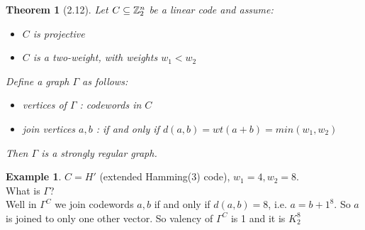 \documentclass[]{article}
\newtheorem{thm}{Theorem}[section]
\theoremstyle{definition}
\newtheorem*{exmp}{Example}
\theoremstyle{remark}
\numberwithin{equation}{section}
\begin{document}
		\begin{thm}[2.12]
			Let $C \subseteq \mathbb{Z}_2^n$ be a linear code and assume:
			\begin{itemize}
				\item $C$ is projective
				\item $C$ is a two-weight, with weights $w_1 < w_2$
			\end{itemize}

			Define a graph $\Gamma$ as follows:

			\begin{itemize}
				\item vertices of $\Gamma$ : codewords in $C$
				\item join vertices $a, b$ : if and only if $d(a, b) = wt(a + b) = min(w_1, w_2)$
			\end{itemize}
			Then $\Gamma$ is a strongly regular graph.
		\end{thm}

		\begin{exmp} $C = H'$ (extended Hamming(3) code), $w_1 = 4, w_2 = 8$.\\
		What is $\Gamma$?\\
		Well in $\Gamma^C$ we join codewords $a, b$ if and only if $d(a,b) = 8$, i.e. $a = b + 1^8$. So $a$ is joined to only one other vector. So valency of $\Gamma^C$ is 1 and it is $K_2^8$
		\end{exmp}
\end{document}
